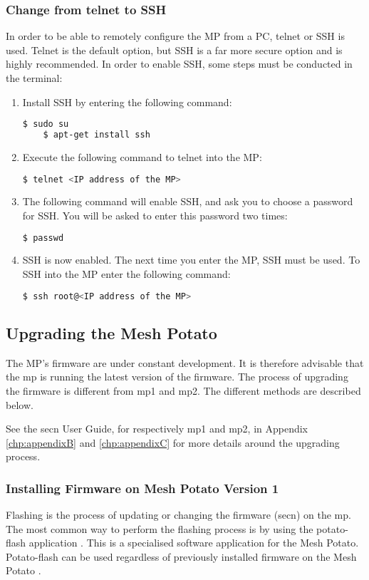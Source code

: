 \subsubsection{Change from telnet to SSH}
\label{subsubsec:ssh}
In order to be able to remotely configure the MP from a PC, telnet or SSH is used. Telnet is the default option, but SSH is a far more secure option and is highly recommended. In order to enable SSH, some steps must be conducted in the terminal:
\begin{enumerate}
\item Install SSH by entering the following command:
\noindent
\begin{lstlisting}[language=bash]
	$ sudo su
	$ apt-get install ssh
\end{lstlisting}
\item Execute the following command to telnet into the MP:
\noindent
\begin{lstlisting}[language=bash]
	$ telnet <IP address of the MP>
\end{lstlisting}
\item The following command will enable SSH, and ask you to choose a password for SSH. You will be asked to enter this password two times:
\noindent
\begin{lstlisting}[language=bash]
	$ passwd
\end{lstlisting}
\item SSH is now enabled. The next time you enter the MP, SSH must be used. To SSH into the MP enter the following command:
\noindent
\begin{lstlisting}[language=bash]
	$ ssh root@<IP address of the MP>
\end{lstlisting}
\end{enumerate}


\subsection{Upgrading the Mesh Potato}
\label{subsec:upgrading}
The MP's firmware are under constant development. It is therefore advisable that the \gls{mp} is running the latest version of the firmware. The process of upgrading the firmware is different from \gls{mp1} and \gls{mp2}. The different methods are described below. 

See the \gls{secn} User Guide, for respectively \gls{mp1} and \gls{mp2}, in Appendix \ref{chp:appendixB} and \ref{chp:appendixC} for more details around the upgrading process.

\subsubsection{Installing Firmware on Mesh Potato Version 1}
Flashing is the process of updating or changing the firmware (\gls{secn}) on the \gls{mp}. The most common way to perform the flashing process is by using the potato-flash application \cite{flashing}. This is a specialised software application for the Mesh Potato. Potato-flash can be used regardless of previously installed firmware on the Mesh Potato \cite{InstallingSecnFirmware}. 

